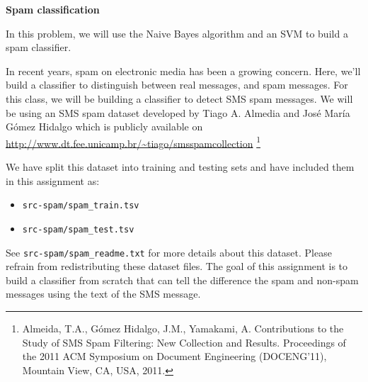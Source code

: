 \item {\bf Spam classification}

In this problem, we will use the Naive Bayes algorithm and an SVM to
build a spam classifier.

In recent years, spam on electronic media has been a growing concern.  Here, we'll build a classifier to distinguish
between real messages, and spam messages. For this class, we will be building a classifier to detect SMS spam messages. We will be using an SMS spam dataset developed by Tiago A. Almedia and José María Gómez Hidalgo which is publicly available on \url{http://www.dt.fee.unicamp.br/~tiago/smsspamcollection} \footnote{Almeida, T.A., Gómez Hidalgo, J.M., Yamakami, A. Contributions to the Study of SMS Spam Filtering: New Collection and Results.  Proceedings of the 2011 ACM Symposium on Document Engineering (DOCENG'11), Mountain View, CA, USA, 2011.}

We have split this dataset into training and testing sets and have included them in this assignment as:
\begin{itemize}
  \item \texttt{src-spam/spam\_train.tsv}
  \item \texttt{src-spam/spam\_test.tsv}
\end{itemize}
See \texttt{src-spam/spam\_readme.txt} for more details about this dataset. Please refrain from redistributing these dataset files. The goal of this assignment is to build a classifier from scratch that can tell the difference the spam and non-spam messages using the text of the SMS message.

\begin{enumerate}
  

  

  

  
\end{enumerate}
